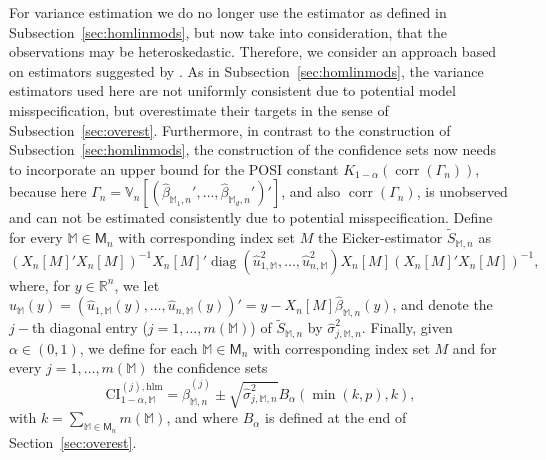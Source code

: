 \documentclass[preprint]{imsart}
\newcommand{\R}{{\mathbb R}}
\newcommand{\V}{{\mathbb V}}
\newcommand{\M}{\mathbb M}
\DeclareMathOperator{\diag}{diag}
\DeclareMathOperator{\corr}{corr}
\numberwithin{equation}{section}
\begin{document}
For variance estimation we do no longer use the estimator as defined in Subsection~\ref{sec:homlinmods}, but now take into consideration, that the observations may be heteroskedastic. Therefore, we consider an approach based on estimators suggested by \cite{eicker67}. As in Subsection~\ref{sec:homlinmods}, the variance estimators used here are not uniformly consistent due to potential model misspecification, but overestimate their targets in the sense of Subsection~\ref{sec:overest}. Furthermore, in contrast to the construction of Subsection~\ref{sec:homlinmods}, the construction of the confidence sets now needs to incorporate an upper bound for the POSI constant $K_{1-\alpha}(\corr(\Gamma_n))$, because here $\Gamma_n = \V_n[(\hat{\beta}_{\M_1,n}',\dots, \hat{\beta}_{\M_d,n}')']$, and also $\corr(\Gamma_n)$, is unobserved and can not be estimated consistently due to potential misspecification. Define for every $\mathbb{M} \in \mathsf{M}_n$ with corresponding index set $M$ the Eicker-estimator $\tilde{S}_{\M,n}$ as
%
\begin{equation*}
\left( X_n[M]'X_n[M] \right)^{-1} X_n[M]' \diag\left(\hat{u}^2_{1,\mathbb{M}}, \hdots, \hat{u}^2_{n,\mathbb{M}} \right) X_n[M] \left( X_n[M]'X_n[M] \right)^{-1},
\end{equation*}
%
where, for $y\in\R^n$, we let $\hat{u}_{\mathbb{M}}(y) = (\hat{u}_{1, \mathbb{M}}(y), \hdots, \hat{u}_{n, \mathbb{M}}(y))' = y - X_n[M] \hat{\beta}_{\mathbb{M}, n}(y)$, and denote the $j-$th diagonal entry ($j = 1, \hdots, m(\mathbb{M})$) of $\tilde{S}_{\M,n}$ by
$\hat{\sigma}^2_{j,\mathbb{M}, n}$.
Finally, given $\alpha \in (0, 1)$, we define for each $\mathbb{M} \in \mathsf{M}_n$ with corresponding index set $M$ and for every $j = 1, \hdots, m(\mathbb{M})$ the confidence sets
%
\begin{equation*}
\mathrm{CI}_{1-\alpha, \mathbb{M}}^{(j), \mathrm{hlm}} = \hat{\beta}^{(j)}_{\mathbb{M}, n} \pm  \sqrt{\hat{\sigma}^2_{j,\mathbb{M}, n}} B_{\alpha}(\min(k, p),k),
\end{equation*}
%
with $k = \sum_{\M\in\mathsf{M}_n} m(\mathbb{M})$, and where $B_\alpha$ is defined at the end of Section~\ref{sec:overest}.
\end{document}
